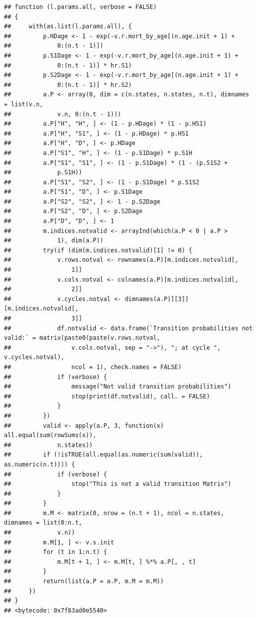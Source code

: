 \documentclass[]{article}
\begin{document}
\begin{verbatim}
## function (l.params.all, verbose = FALSE) 
## {
##     with(as.list(l.params.all), {
##         p.HDage <- 1 - exp(-v.r.mort_by_age[(n.age.init + 1) + 
##             0:(n.t - 1)])
##         p.S1Dage <- 1 - exp(-v.r.mort_by_age[(n.age.init + 1) + 
##             0:(n.t - 1)] * hr.S1)
##         p.S2Dage <- 1 - exp(-v.r.mort_by_age[(n.age.init + 1) + 
##             0:(n.t - 1)] * hr.S2)
##         a.P <- array(0, dim = c(n.states, n.states, n.t), dimnames = list(v.n, 
##             v.n, 0:(n.t - 1)))
##         a.P["H", "H", ] <- (1 - p.HDage) * (1 - p.HS1)
##         a.P["H", "S1", ] <- (1 - p.HDage) * p.HS1
##         a.P["H", "D", ] <- p.HDage
##         a.P["S1", "H", ] <- (1 - p.S1Dage) * p.S1H
##         a.P["S1", "S1", ] <- (1 - p.S1Dage) * (1 - (p.S1S2 + 
##             p.S1H))
##         a.P["S1", "S2", ] <- (1 - p.S1Dage) * p.S1S2
##         a.P["S1", "D", ] <- p.S1Dage
##         a.P["S2", "S2", ] <- 1 - p.S2Dage
##         a.P["S2", "D", ] <- p.S2Dage
##         a.P["D", "D", ] <- 1
##         m.indices.notvalid <- arrayInd(which(a.P < 0 | a.P > 
##             1), dim(a.P))
##         try(if (dim(m.indices.notvalid)[1] != 0) {
##             v.rows.notval <- rownames(a.P)[m.indices.notvalid[, 
##                 1]]
##             v.cols.notval <- colnames(a.P)[m.indices.notvalid[, 
##                 2]]
##             v.cycles.notval <- dimnames(a.P)[[3]][m.indices.notvalid[, 
##                 3]]
##             df.notvalid <- data.frame(`Transition probabilities not valid:` = matrix(paste0(paste(v.rows.notval, 
##                 v.cols.notval, sep = "->"), "; at cycle ", v.cycles.notval), 
##                 ncol = 1), check.names = FALSE)
##             if (verbose) {
##                 message("Not valid transition probabilities")
##                 stop(print(df.notvalid), call. = FALSE)
##             }
##         })
##         valid <- apply(a.P, 3, function(x) all.equal(sum(rowSums(x)), 
##             n.states))
##         if (!isTRUE(all.equal(as.numeric(sum(valid)), as.numeric(n.t)))) {
##             if (verbose) {
##                 stop("This is not a valid transition Matrix")
##             }
##         }
##         m.M <- matrix(0, nrow = (n.t + 1), ncol = n.states, dimnames = list(0:n.t, 
##             v.n))
##         m.M[1, ] <- v.s.init
##         for (t in 1:n.t) {
##             m.M[t + 1, ] <- m.M[t, ] %*% a.P[, , t]
##         }
##         return(list(a.P = a.P, m.M = m.M))
##     })
## }
## <bytecode: 0x7f83ad0e5540>
\end{verbatim}
\end{document}
